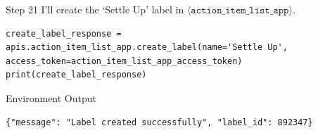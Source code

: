 \begin{agentbox}{Step 21}
I'll create the `Settle Up' label in $\langle\mathtt{action\_item\_list\_app}\rangle$.
\begin{Verbatim}[fontsize=\scriptsize, breaklines, breakanywhere]
create_label_response = apis.action_item_list_app.create_label(name='Settle Up', access_token=action_item_list_app_access_token)
print(create_label_response)
\end{Verbatim}
\end{agentbox}
\begin{envbox}{Environment Output}
\begin{Verbatim}[fontsize=\scriptsize, breaklines, breakanywhere]
{"message": "Label created successfully", "label_id": 892347}

\end{Verbatim}
\end{envbox}

